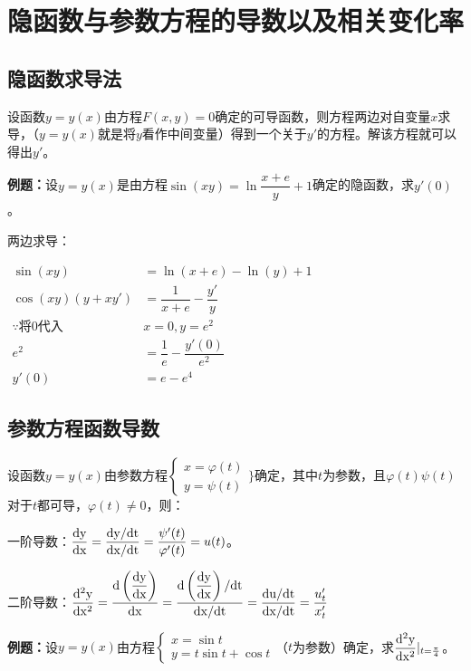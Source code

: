 \documentclass[UTF8, 12pt]{ctexart}
\begin{document}
\section{隐函数与参数方程的导数以及相关变化率}

\subsection{隐函数求导法}

设函数$y=y(x)$由方程$F(x,y)=0$确定的可导函数，则方程两边对自变量$x$求导，（$y=y(x)$就是将$y$看作中间变量）得到一个关于$y'$的方程。解该方程就可以得出$y'$。

\textbf{例题：}设$y=y(x)$是由方程$\sin(xy)=\ln\dfrac{x+e}{y}+1$确定的隐函数，求$y'(0)$。

两边求导：

$
\begin{aligned}
    \sin(xy) &=\ln(x+e)-\ln(y)+1 \\
    \cos(xy)(y+xy') &=\dfrac{1}{x+e}-\dfrac{y'}{y} \\
    \because\text{将0代入} & x=0, y=e^2 \\
    e^2&=\dfrac{1}{e}-\dfrac{y'(0)}{e^2} \\
    y'(0) & =e-e^4
\end{aligned}
$

\subsection{参数方程函数导数}

设函数$y=y(x)$由参数方程$\left\{
    \begin{array}{l}
        x=\varphi(t) \\
        y=\psi(t)
    \end{array}
\}\right.$确定，其中$t$为参数，且$\varphi(t)\psi(t)$对于$t$都可导，$\varphi(t)\neq 0$，则：

\bigskip

一阶导数：$\dfrac{\rm{d}y}{\rm{d}x}=\dfrac{\rm{d}y/\rm{d}t}{\rm{d}x/\rm{d}t}=\dfrac{\psi'(t)}{\varphi'(t)}=u(t)$。

二阶导数：$\dfrac{\rm{d}^2y}{\rm{d}x^2}=\dfrac{\rm{d}\left(\dfrac{\rm{d}y}{\rm{d}x}\right)}{\rm{d}x}=\dfrac{\rm{d}\left(\dfrac{\rm{d}y}{\rm{d}x}\right)/\rm{d}t}{\rm{d}x/\rm{d}t}=\dfrac{\rm{d}u/\rm{d}t}{\rm{d}x/\rm{d}t}=\dfrac{u'_t}{x'_t}$

\textbf{例题：}设$y=y(x)$由方程$\left\{
\begin{array}{l}
    x=\sin t \\
    y=t\sin t+\cos t
\end{array}
\right.
$（$t$为参数）确定，求$\dfrac{\rm{d}^2y}{\rm{d}x^2}\vert_{t=\frac{\pi}{4}}$。
\end{document}
